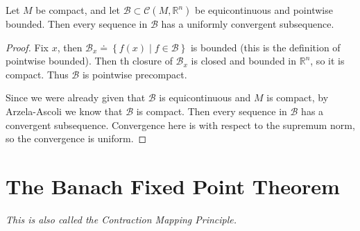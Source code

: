 \documentclass[10pt]{report}
\begin{document}
\begin{cor}
	Let $M$ be compact, and let $\mathcal{B}\subset \mathcal{C}(M, \mathbb{R}^n)$ be equicontinuous and pointwise bounded. Then every sequence in $\mathcal{B}$ has a uniformly convergent subsequence.
\end{cor}
\begin{proof}
	Fix $x$, then $\mathcal{B}_x \doteq \left\{ f(x) \;|\; f \in \mathcal{B} \right\}$ is bounded (this is the definition of pointwise bounded). Then th closure of $\mathcal{B}_x $ is closed and bounded in $\mathbb{R}^n$, so it is compact. Thus $\mathcal{B}$ is pointwise precompact.

	Since we were already given that $\mathcal{B}$ is equicontinuous and $M$ is compact, by Arzela-Ascoli we know that $\mathcal{B}$ is compact. Then every sequence in $\mathcal{B}$ has a convergent subsequence. Convergence here is with respect to the supremum norm, so the convergence is uniform.
\end{proof}



\section{The Banach Fixed Point Theorem}

\textit{This is also called the Contraction Mapping Principle.}
\end{document}
